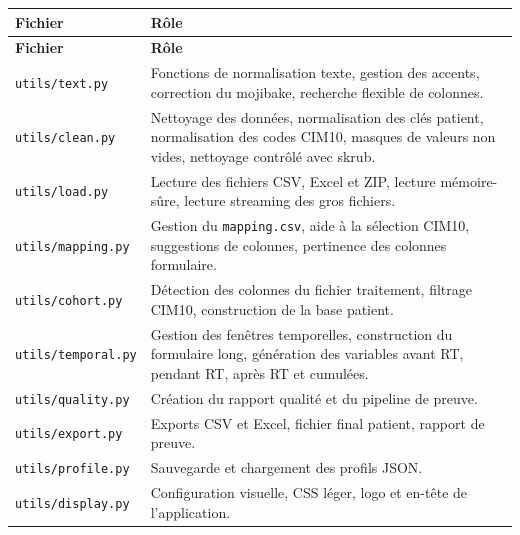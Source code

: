 \documentclass[11pt,a4paper]{article}
\begin{document}
\begin{longtable}{|p{}|p{}|}
\hline
\rowcolor{lightblue}
\textbf{Fichier} & \textbf{Rôle} \\
\hline
\endfirsthead

\hline
\rowcolor{lightblue}
\textbf{Fichier} & \textbf{Rôle} \\
\hline
\endhead

\texttt{utils/text.py}
&
Fonctions de normalisation texte, gestion des accents, correction du mojibake,
recherche flexible de colonnes.
\\
\hline

\texttt{utils/clean.py}
&
Nettoyage des données, normalisation des clés patient, normalisation des codes
CIM10, masques de valeurs non vides, nettoyage contrôlé avec skrub.
\\
\hline

\texttt{utils/load.py}
&
Lecture des fichiers CSV, Excel et ZIP, lecture mémoire-sûre, lecture streaming
des gros fichiers.
\\
\hline

\texttt{utils/mapping.py}
&
Gestion du \texttt{mapping.csv}, aide à la sélection CIM10, suggestions de
colonnes, pertinence des colonnes formulaire.
\\
\hline

\texttt{utils/cohort.py}
&
Détection des colonnes du fichier traitement, filtrage CIM10, construction de la
base patient.
\\
\hline

\texttt{utils/temporal.py}
&
Gestion des fenêtres temporelles, construction du formulaire long, génération
des variables avant RT, pendant RT, après RT et cumulées.
\\
\hline

\texttt{utils/quality.py}
&
Création du rapport qualité et du pipeline de preuve.
\\
\hline

\texttt{utils/export.py}
&
Exports CSV et Excel, fichier final patient, rapport de preuve.
\\
\hline

\texttt{utils/profile.py}
&
Sauvegarde et chargement des profils JSON.
\\
\hline

\texttt{utils/display.py}
&
Configuration visuelle, CSS léger, logo et en-tête de l'application.
\\
\hline

\end{longtable}
\end{document}
